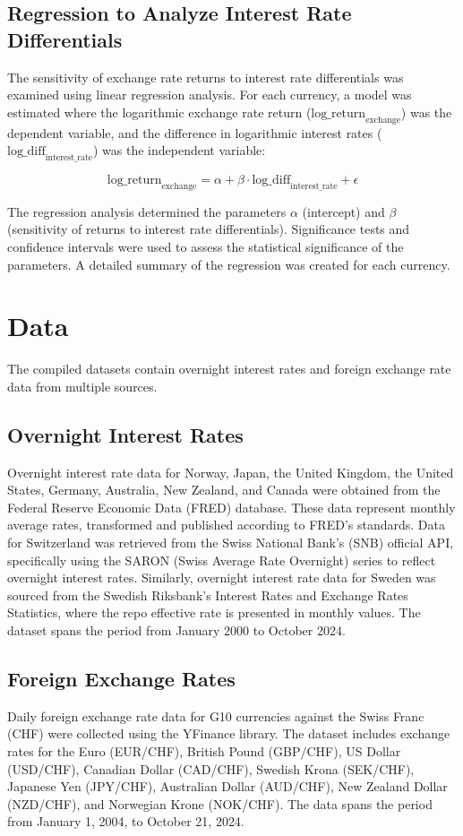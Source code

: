 \documentclass{article}
\begin{document}
\subsection{Regression to Analyze Interest Rate Differentials}

The sensitivity of exchange rate returns to interest rate differentials was examined using linear regression analysis. For each currency, a model was estimated where the logarithmic exchange rate return (\(\text{log\_return}_{\text{exchange}}\)) was the dependent variable, and the difference in logarithmic interest rates (\(\text{log\_diff}_{\text{interest\_rate}}\)) was the independent variable:

\[
\text{log\_return}_{\text{exchange}} = \alpha + \beta \cdot \text{log\_diff}_{\text{interest\_rate}} + \epsilon
\]

The regression analysis determined the parameters \(\alpha\) (intercept) and \(\beta\) (sensitivity of returns to interest rate differentials). Significance tests and confidence intervals were used to assess the statistical significance of the parameters. A detailed summary of the regression was created for each currency.

\section{Data}
The compiled datasets contain overnight interest rates and foreign exchange rate data from multiple sources.

\subsection{Overnight Interest Rates}
Overnight interest rate data for Norway, Japan, the United Kingdom, the United States, Germany, Australia, New Zealand, and Canada were obtained from the Federal Reserve Economic Data (FRED) database. These data represent monthly average rates, transformed and published according to FRED's standards. Data for Switzerland was retrieved from the Swiss National Bank's (SNB) official API, specifically using the SARON (Swiss Average Rate Overnight) series to reflect overnight interest rates. Similarly, overnight interest rate data for Sweden was sourced from the Swedish Riksbank’s Interest Rates and Exchange Rates Statistics, where the repo effective rate is presented in monthly values. The dataset spans the period from January 2000 to October 2024.

\subsection{Foreign Exchange Rates}
Daily foreign exchange rate data for G10 currencies against the Swiss Franc (CHF) were collected using the YFinance library. The dataset includes exchange rates for the Euro (EUR/CHF), British Pound (GBP/CHF), US Dollar (USD/CHF), Canadian Dollar (CAD/CHF), Swedish Krona (SEK/CHF), Japanese Yen (JPY/CHF), Australian Dollar (AUD/CHF), New Zealand Dollar (NZD/CHF), and Norwegian Krone (NOK/CHF). The data spans the period from January 1, 2004, to October 21, 2024.
\end{document}
